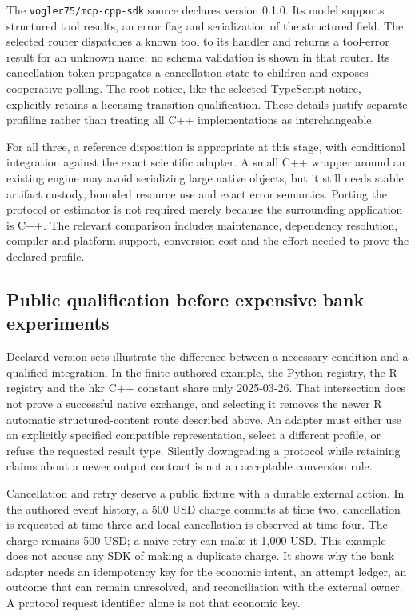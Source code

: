 The \texttt{vogler75/mcp-cpp-sdk} source declares version 0.1.0. Its model
supports structured tool results, an error flag and serialization of the
structured field. The selected router dispatches a known tool to its handler
and returns a tool-error result for an unknown name; no schema validation is
shown in that router. Its cancellation token propagates a cancellation state
to children and exposes cooperative polling. The root notice, like the
selected TypeScript notice, explicitly retains a licensing-transition
qualification. These details justify separate profiling rather than treating
all C++ implementations as interchangeable.
\citep{exec24_mcp_cpp_vogler}

For all three, a reference disposition is appropriate at this stage, with
conditional integration against the exact scientific adapter. A small C++
wrapper around an existing engine may avoid serializing large native objects,
but it still needs stable artifact custody, bounded resource use and exact
error semantics. Porting the protocol or estimator is not required merely
because the surrounding application is C++. The relevant comparison includes
maintenance, dependency resolution, compiler and platform support, conversion
cost and the effort needed to prove the declared profile.
\citep{exec24_mcp_contracts}

\subsection{Public qualification before expensive bank experiments}

Declared version sets illustrate the difference between a necessary condition
and a qualified integration. In the finite authored example, the Python
registry, the R registry and the hkr C++ constant share only 2025-03-26.
That intersection does not prove a successful native exchange, and selecting
it removes the newer R automatic structured-content route described above.
An adapter must either use an explicitly specified compatible representation,
select a different profile, or refuse the requested result type. Silently
downgrading a protocol while retaining claims about a newer output contract
is not an acceptable conversion rule.~\citep{exec24_mcp_python,
exec24_mcp_r,exec24_mcp_cpp_hkr,exec24_mcp_contracts}

Cancellation and retry deserve a public fixture with a durable external
action. In the authored event history, a 500 USD charge commits at time two,
cancellation is requested at time three and local cancellation is observed
at time four. The charge remains 500 USD; a naive retry can make it 1,000 USD.
This example does not accuse any SDK of making a duplicate charge. It shows
why the bank adapter needs an idempotency key for the economic intent, an
attempt ledger, an outcome that can remain unresolved, and reconciliation
with the external owner. A protocol request identifier alone is not that
economic key.~\citep{exec24_mcp_contracts}

